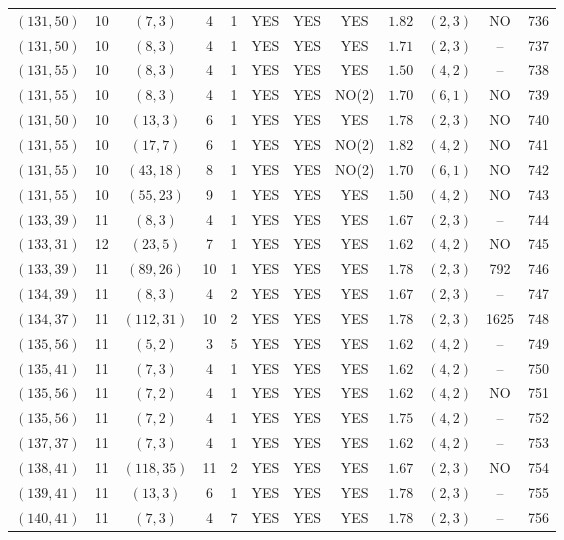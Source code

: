 \begin{longtable}{|c|c|c|c|c|c|c|c|c|c|c|c|}
$(131,50)$ & 10 & $(7,3)$ & 4 & 1 & YES & YES & YES & $1.82$ & $(2,3)$ & NO & 736\\
$(131,50)$ & 10 & $(8,3)$ & 4 & 1 & YES & YES & YES & $1.71$ & $(2,3)$ & -- & 737\\
$(131,55)$ & 10 & $(8,3)$ & 4 & 1 & YES & YES & YES & $1.50$ & $(4,2)$ & -- & 738\\
$(131,55)$ & 10 & $(8,3)$ & 4 & 1 & YES & YES & NO(2) & $1.70$ & $(6,1)$ & NO & 739\\
$(131,50)$ & 10 & $(13,3)$ & 6 & 1 & YES & YES & YES & $1.78$ & $(2,3)$ & NO & 740\\
$(131,55)$ & 10 & $(17,7)$ & 6 & 1 & YES & YES & NO(2) & $1.82$ & $(4,2)$ & NO & 741\\
$(131,55)$ & 10 & $(43,18)$ & 8 & 1 & YES & YES & NO(2) & $1.70$ & $(6,1)$ & NO & 742\\
$(131,55)$ & 10 & $(55,23)$ & 9 & 1 & YES & YES & YES & $1.50$ & $(4,2)$ & NO & 743\\
$(133,39)$ & 11 & $(8,3)$ & 4 & 1 & YES & YES & YES & $1.67$ & $(2,3)$ & -- & 744\\
$(133,31)$ & 12 & $(23,5)$ & 7 & 1 & YES & YES & YES & $1.62$ & $(4,2)$ & NO & 745\\
$(133,39)$ & 11 & $(89,26)$ & 10 & 1 & YES & YES & YES & $1.78$ & $(2,3)$ & 792 & 746\\
$(134,39)$ & 11 & $(8,3)$ & 4 & 2 & YES & YES & YES & $1.67$ & $(2,3)$ & -- & 747\\
$(134,37)$ & 11 & $(112,31)$ & 10 & 2 & YES & YES & YES & $1.78$ & $(2,3)$ & 1625 & 748\\
$(135,56)$ & 11 & $(5,2)$ & 3 & 5 & YES & YES & YES & $1.62$ & $(4,2)$ & -- & 749\\
$(135,41)$ & 11 & $(7,3)$ & 4 & 1 & YES & YES & YES & $1.62$ & $(4,2)$ & -- & 750\\
$(135,56)$ & 11 & $(7,2)$ & 4 & 1 & YES & YES & YES & $1.62$ & $(4,2)$ & NO & 751\\
$(135,56)$ & 11 & $(7,2)$ & 4 & 1 & YES & YES & YES & $1.75$ & $(4,2)$ & -- & 752\\
$(137,37)$ & 11 & $(7,3)$ & 4 & 1 & YES & YES & YES & $1.62$ & $(4,2)$ & -- & 753\\
$(138,41)$ & 11 & $(118,35)$ & 11 & 2 & YES & YES & YES & $1.67$ & $(2,3)$ & NO & 754\\
$(139,41)$ & 11 & $(13,3)$ & 6 & 1 & YES & YES & YES & $1.78$ & $(2,3)$ & -- & 755\\
$(140,41)$ & 11 & $(7,3)$ & 4 & 7 & YES & YES & YES & $1.78$ & $(2,3)$ & -- & 756\\

\end{longtable}

